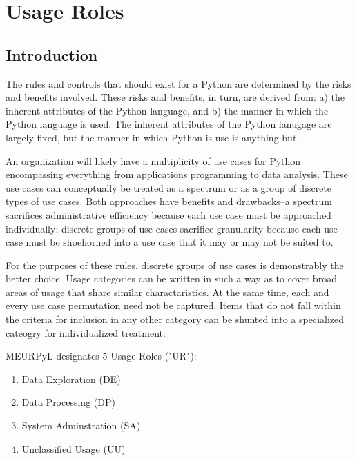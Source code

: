 \section{Usage Roles}

\thispagestyle{section_start_style}

	\subsection*{Introduction}

		The rules and controls that should exist for a Python are determined by the risks and benefits involved. These risks and benefits, in turn, are derived from: a) the inherent attributes of the Python language, and b) the manner in which the Python language is used. The inherent attributes of the Python lanugage are largely fixed, but the manner in which Python is use is anything but.

		An organization will likely have a multiplicity of use cases for Python encompassing everything from applications programming to data analysis. These use cases can conceptually be treated as a spectrum or as a group of discrete types of use cases. Both approaches have benefits and drawbacks--a spectrum sacrifices administrative efficiency because each use case must be approached individually; discrete groups of use cases sacrifice granularity because each use case must be shoehorned into a use case that it may or may not be suited to.

		For the purposes of these rules, discrete groups of use cases is demonstrably the better choice. Usage categories can be written in such a way as to cover broad areas of usage that share similar charactaristics. At the same time, each and every use case permutation need not be captured. Items that do not fall within the criteria for inclusion in any other category can be shunted into a specialized cateogry for individualized treatment.

		MEURPyL designates 5 Usage Roles ("UR"):

		\begin{enumerate}
        	\item Data Exploration (DE)
        	\item Data Processing (DP)
        	\item System Adminstration (SA)
        	\item Unclassified Usage (UU)
        \end{enumerate}


